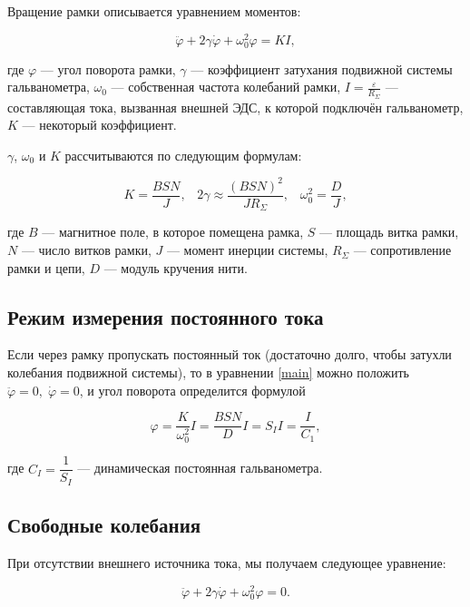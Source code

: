 \documentclass[12pt,a4paper]{article}
\begin{document}
	
	Вращение рамки описывается уравнением моментов:
	
    \begin{equation}\label{main}
        \ddot{\varphi} + 2\gamma\dot{\varphi }+ \omega_0^2\varphi = K I,
    \end{equation}
    
    где $\varphi$ --- угол поворота рамки, $\gamma$ --- коэффициент затухания подвижной системы гальванометра, $\omega_0$ --- собственная частота колебаний рамки, $I = \frac{\varepsilon}{R_\Sigma}$ --- составляющая тока, вызванная внешней ЭДС, к которой подключён гальванометр, $K$ --- некоторый коэффициент.
    
    $\gamma$, $\omega_0$ и $K$ рассчитываются по следующим формулам:
        
    \begin{equation}
       K = \dfrac{BSN}{J}, \;\;\; 2\gamma \approx \dfrac{(BSN)^2}{JR_\Sigma}, \;\;\; \omega_0^2 = \dfrac{D}{J},
    \end{equation}
    
    где $B$ --- магнитное поле, в которое помещена рамка, $S$ --- площадь витка рамки, $N$ --- число витков рамки, $J$ --- момент инерции системы, $R_\Sigma$ --- сопротивление рамки и цепи, $D$ --- модуль кручения нити.


\subsection*{Режим измерения постоянного тока}

	Если через рамку пропускать постоянный ток (достаточно долго, чтобы затухли колебания подвижной системы), то в уравнении \eqref{main} можно положить $\ddot{\varphi} = 0, \; \dot{\varphi } = 0$, и угол поворота определится формулой
	
	\begin{equation}\label{C2}
	\varphi = \dfrac{K}{\omega_0^2}I = \dfrac{BSN}{D}I = S_I I = \dfrac{I}{C_1},
	\end{equation}
	
	где $C_I = \dfrac{1}{S_I}$ --- динамическая постоянная гальванометра.
	
\subsection*{Свободные колебания}
	
	При отсутствии внешнего источника тока, мы получаем следующее уравнение: 
	
	\begin{equation}\label{main}
    \ddot{\varphi} + 2\gamma\dot{\varphi }+ \omega_0^2\varphi = 0.
    \end{equation}
    
\end{document}
